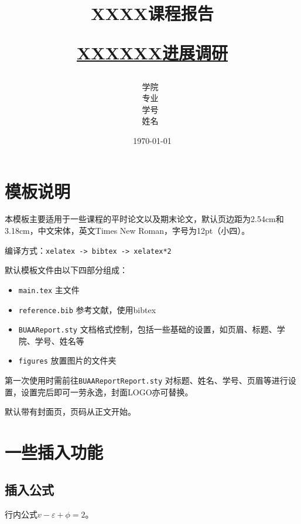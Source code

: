 \documentclass[12pt,hyperref,a4paper,UTF8]{ctexart}
\title{ 
        \vspace{1cm}
        \heiti \Huge \textbf{{XXXX课程报告}} \par
        \vspace{1cm} 
        \heiti \Large {\underline{XXXXXX进展调研}}    
        \vspace{3cm}
    }
\author{
        \vspace{0.5cm}
        \kaishu\Large 学院\ \dlmu[9cm]{计算机学院} \\ %
        \vspace{0.5cm}
        \kaishu\Large 专业\ \dlmu[9cm]{计算机科学与技术} \\ %
        \vspace{0.5cm}
        \kaishu\Large 学号\ \dlmu[9cm]{2023XXXXXX} \qquad  \\ %
        \vspace{0.5cm}
        \kaishu\Large 姓名\ \dlmu[9cm]{XXX} \qquad \\ %
    }
\date{\today} %
\begin{document}
\cover

%
%

\thispagestyle{empty} %


\newpage
\setcounter{page}{1} %


\section{模板说明}
本模板主要适用于一些课程的平时论文以及期末论文，默认页边距为2.54cm和3.18cm，中文宋体，英文Times New Roman，字号为12pt（小四）。

编译方式：\verb|xelatex -> bibtex -> xelatex*2|


默认模板文件由以下四部分组成：
\begin{itemize}
    \item \texttt{main.tex} 主文件
    \item \texttt{reference.bib} 参考文献，使用bibtex
    \item \texttt{BUAAReport.sty} 文档格式控制，包括一些基础的设置，如页眉、标题、学院、学号、姓名等
    \item \texttt{figures} 放置图片的文件夹
\end{itemize}

第一次使用时需前往\texttt{BUAAReportReport.sty} 对标题、姓名、学号、页眉等进行设置，设置完后即可一劳永逸，封面LOGO亦可替换。

默认带有封面页，页码从正文开始。

\section{一些插入功能}
\subsection{插入公式}
行内公式$v-\varepsilon+\phi=2$。
\end{document}
